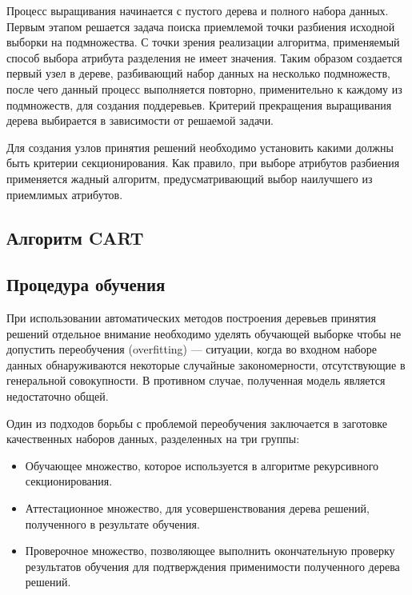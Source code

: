 \documentclass[a4paper,14pt]{extarticle} %
\begin{document}
Процесс выращивания начинается с пустого дерева и полного набора данных. Первым этапом решается задача поиска приемлемой точки разбиения исходной выборки на подмножества. С точки зрения реализации алгоритма, применяемый способ выбора атрибута разделения не имеет значения. Таким образом создается первый узел в дереве, разбивающий набор данных на несколько подмножеств, после чего данный процесс выполняется повторно, применительно к каждому из подмножеств, для создания поддеревьев. Критерий прекращения выращивания дерева выбирается в зависимости от решаемой задачи.

Для создания узлов принятия решений необходимо установить какими должны быть критерии секционирования. Как правило, при выборе атрибутов разбиения применяется жадный алгоритм, предусматривающий выбор наилучшего из приемлимых атрибутов.

\subsection{Алгоритм CART}
\hspace{\parindent}

\subsection{Процедура обучения}
\hspace{\parindent} При использовании автоматических методов построения деревьев принятия решений отдельное внимание необходимо уделять обучающей выборке чтобы не допустить переобучения (overfitting) --- ситуации, когда во входном наборе данных обнаруживаются некоторые случайные закономерности, отсутствующие в генеральной совокупности. В противном случае, полученная модель является недостаточно общей.

Один из подходов борьбы с проблемой переобучения заключается в заготовке качественных наборов данных, разделенных на три группы:
\begin{itemize}
\item Обучающее множество, которое используется в алгоритме рекурсивного секционирования.
\item Аттестационное множество, для усовершенствования дерева решений, полученного в результате обучения.
\item Проверочное множество, позволяющее выполнить окончательную проверку результатов обучения для подтверждения применимости полученного дерева решений.
\end{itemize}
\end{document}
